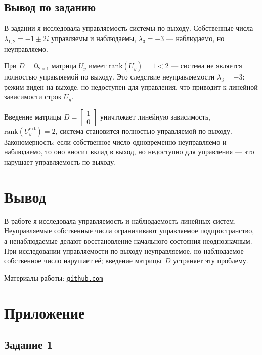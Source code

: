\documentclass[a4paper,12pt]{article}
\begin{document}
	\newpage
	\subsection{Вывод по заданию}
	
	В задании я исследовала управляемость системы по выходу.
	Собственные числа $\lambda_{1,2} = -1 \pm 2i$ управляемы и наблюдаемы,
	$\lambda_3 = -3$ — наблюдаемо, но неуправляемо.
	
	При $D = \mathbf{0}_{2\times1}$ матрица $U_y$ имеет $\text{rank}(U_y) = 1 < 2$
	— система не является полностью управляемой по выходу. Это следствие
	неуправляемости $\lambda_3 = -3$: режим виден на выходе, но недоступен
	для управления, что приводит к линейной зависимости строк $U_y$.
	
	Введение матрицы $D = \begin{bmatrix}1\\0\end{bmatrix}$ уничтожает линейную
	зависимость, $\text{rank}(U_y^{\text{ext}}) = 2$, система становится
	полностью управляемой по выходу.\\
	
	Закономерность: если собственное
	число одновременно неуправляемо и наблюдаемо, то оно вносит вклад
	в выход, но недоступно для управления — это нарушает управляемость по выходу.
	
	\newpage
	\section{Вывод}
	
	В работе я исследовала управляемость и наблюдаемость линейных систем.
	Неуправляемые собственные числа ограничивают управляемое подпространство,
	а ненаблюдаемые делают восстановление начального состояния неоднозначным.
	При исследовании управляемости по выходу неуправляемое, но наблюдаемое
	собственное число нарушает её; введение матрицы~$D$ устраняет эту проблему.
	
	Материалы работы: \href{https://github.com/decadeos/ITMO/tree/master/3_course/TAU/lab1}{\texttt{github.com}}
	
	\newpage
	\section{Приложение}

\subsection*{Задание 1}
\end{document}
